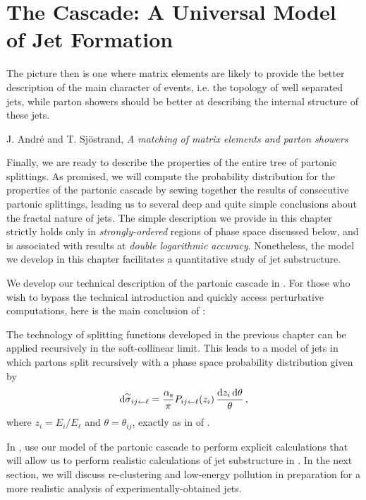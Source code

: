 \section{The Cascade: A Universal Model of Jet Formation}
\label{sec:parton-shower}

\epigraph{The picture then is one where matrix elements are likely to provide the better description of the main character of events, i.e. the topology of well separated jets, while parton showers should be better at describing the internal structure of these jets.}{J. Andr\'e and T. Sj\"ostrand, \textit{A matching of matrix elements and parton showers} \cite{Andre:1997vh}}



Finally, we are ready to describe the properties of the entire tree of partonic splittings.
%
As promised, we will compute the probability distribution for the properties of the partonic cascade by sewing together the results of consecutive partonic splittings, leading us to several deep and quite simple conclusions about the fractal nature of jets.
%
The simple description we provide in this chapter strictly holds only in \textit{strongly-ordered} regions of phase space discussed below, and is associated with results at \textit{double logarithmic accuracy}.
%
Nonetheless, the model we develop in this chapter facilitates a quantitative study of jet substructure.

We develop our technical description of the partonic cascade in .
%
For those who wish to bypass the technical introduction and quickly access perturbative computations, here is the main conclusion of :
\begin{answer}
    The technology of splitting functions developed in the previous chapter can be applied recursively in the soft-collinear limit.
    This leads to a model of jets in which partons split recursively with a phase space probability distribution given by
    \begin{align}
        \dd \overset{\sim}{\sigma}_{ij\leftarrow \ell}
        =
        \frac{\alpha_{\mathrm{s}}}{\pi}
        P_{ij \leftarrow \ell}(z_i)\,\frac{\dd z_i \, \dd \theta}{\theta}
        \,,
    \end{align}
    where \(z_i = E_i / E_\ell\) and \(\theta = \theta_{ij}\), exactly as in  of .
\end{answer}
In , use our model of the partonic cascade to perform explicit calculations that will allow us to perform realistic calculations of jet substructure in .
%
In the next section, we will discuss re-clustering and low-energy pollution in preparation for a more realistic analysis of experimentally-obtained jets.




